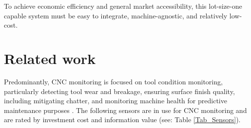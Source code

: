 \documentclass[5p,times,procedia]{elsarticle}
\begin{document}
To achieve economic efficiency and general market accessibility, this lot-size-one capable system must be easy to integrate, machine-agnostic, and relatively low-cost.

\vspace*{-.5\baselineskip}
\begin{nomenclature}
\begin{deflist}[AAA]%
\end{deflist}
\end{nomenclature}\vskip24pt






 
\section{Related work}\label{Sec_RelatedWork}




Predominantly, CNC monitoring is focused on tool condition monitoring, particularly detecting tool wear and breakage, ensuring surface finish quality, including mitigating chatter, and monitoring machine health for predictive maintenance purposes \cite[p.2727]{Kuntoglu.Salur.ea2021}.
The following sensors are in use for CNC monitoring and are rated by investment cost and information value (see: Table \ref{Tab_Sensors}).
\vspace*{-.5\baselineskip}
\end{document}
